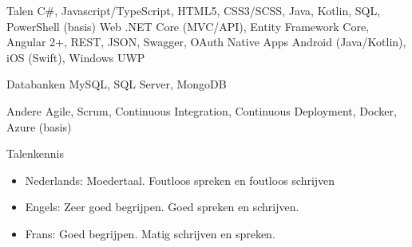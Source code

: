 


\begin{cvskills}


\cvskill
{Talen}
{C\#, Javascript/TypeScript, HTML5, CSS3/SCSS, Java, Kotlin, SQL, PowerShell (basis)}
\cvskill
{Web}
{.NET Core (MVC/API), Entity Framework Core, Angular 2+, REST, JSON, Swagger, OAuth}
\cvskill
{Native Apps}
{Android (Java/Kotlin), iOS (Swift), Windows UWP}

\cvskill
{Databanken}
{MySQL, SQL Server, MongoDB}

\cvskill
{Andere}
{Agile, Scrum, Continuous Integration, Continuous Deployment, Docker, Azure (basis)}

\cvskill
{Talenkennis} %
{
\begin{itemize}
\item {Nederlands: Moedertaal. Foutloos spreken en foutloos schrijven }
\item Engels: Zeer goed begrijpen. Goed spreken en schrijven.
\item Frans: Goed begrijpen. Matig schrijven en spreken.
\end{itemize}
} %


\end{cvskills}